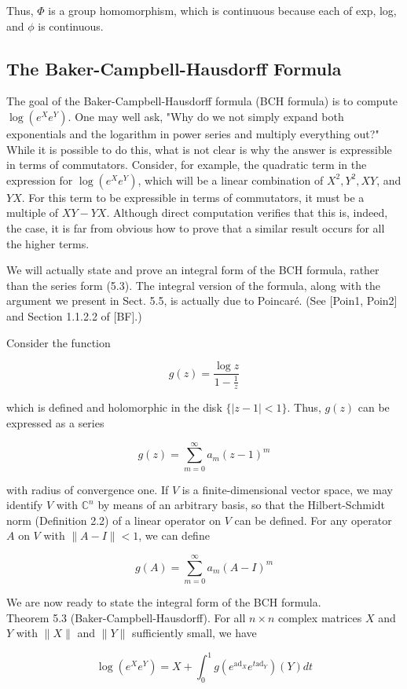 \documentclass[10pt, letterpaper]{article}
\begin{document}
Thus, $\Phi$ is a group homomorphism, which is continuous because each of exp, log, and $\phi$ is continuous.

\subsection*{The Baker-Campbell-Hausdorff Formula}
The goal of the Baker-Campbell-Hausdorff formula (BCH formula) is to compute $\log \left(e^{X} e^{Y}\right)$. One may well ask, "Why do we not simply expand both exponentials and the logarithm in power series and multiply everything out?" While it is possible to do this, what is not clear is why the answer is expressible in terms of commutators. Consider, for example, the quadratic term in the expression for $\log \left(e^{X} e^{Y}\right)$, which will be a linear combination of $X^{2}, Y^{2}, X Y$, and $Y X$. For this term to be expressible in terms of commutators, it must be a multiple of $X Y-Y X$. Although direct computation verifies that this is, indeed, the case, it is far from obvious how to prove that a similar result occurs for all the higher terms.

We will actually state and prove an integral form of the BCH formula, rather than the series form (5.3). The integral version of the formula, along with the argument we present in Sect. 5.5, is actually due to Poincaré. (See [Poin1, Poin2] and Section 1.1.2.2 of [BF].)

Consider the function

$$
g(z)=\frac{\log z}{1-\frac{1}{z}}
$$

which is defined and holomorphic in the disk $\{|z-1|<1\}$. Thus, $g(z)$ can be expressed as a series

$$
g(z)=\sum_{m=0}^{\infty} a_{m}(z-1)^{m}
$$

with radius of convergence one. If $V$ is a finite-dimensional vector space, we may identify $V$ with $\mathbb{C}^{n}$ by means of an arbitrary basis, so that the Hilbert-Schmidt norm (Definition 2.2) of a linear operator on $V$ can be defined. For any operator $A$ on $V$ with $\|A-I\|<1$, we can define

$$
g(A)=\sum_{m=0}^{\infty} a_{m}(A-I)^{m}
$$

We are now ready to state the integral form of the BCH formula.\\
Theorem 5.3 (Baker-Campbell-Hausdorff). For all $n \times n$ complex matrices $X$ and $Y$ with $\|X\|$ and $\|Y\|$ sufficiently small, we have

$$
\log \left(e^{X} e^{Y}\right)=X+\int_{0}^{1} g\left(e^{\mathrm{ad}_{X}} e^{t \mathrm{ad}_{Y}}\right)(Y) d t
$$
\end{document}
